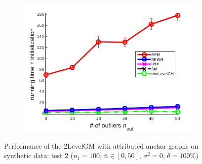 \begin{figure}[h]
\begin{subfigure}[b]{0.33\textwidth}
		\includegraphics[scale=0.25]{"chapter3/fig/SyntheticTest/descr/Results_v4.3.3/Test3/time_summary_avg10t"} 
	\end{subfigure} 	
	\caption[Performance of the 2LevelGM with attributed anchor graphs on synthetic data (test $2$)]{Performance of the 2LevelGM with attributed anchor graphs on synthetic data: test $2$ ($n_1=100$, $\bar{n}\in[0,50]$, $\sigma^2=0$, $\theta=100\%$)}
	\label{fig:synTest2_descr_ver433}
\end{figure}
